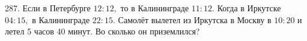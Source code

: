 287. Если в Петербурге $12:12,$ то в Калининграде $11:12.$ Когда в Иркутске $04:15,$ в Калининграде $22:15.$ Самолёт вылетел из Иркутска в Москву в $10:20$ и летел 5 часов 40 минут. Во сколько он приземлился?\\
